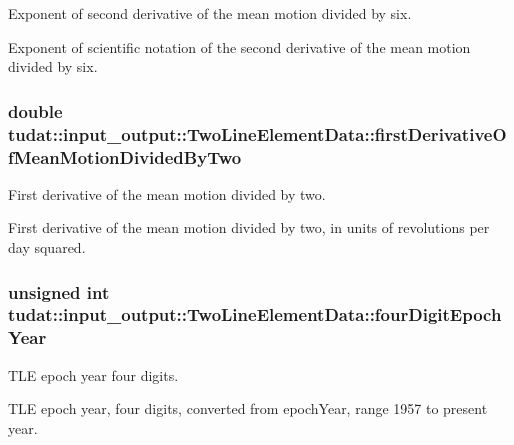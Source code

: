 Exponent of second derivative of the mean motion divided by six. 

Exponent of scientific notation of the second derivative of the mean motion divided by six. 
\subsubsection[{\texorpdfstring{first\+Derivative\+Of\+Mean\+Motion\+Divided\+By\+Two}{firstDerivativeOfMeanMotionDividedByTwo}}]{\setlength{\rightskip}{0pt plus 5cm}double tudat\+::input\+\_\+output\+::\+Two\+Line\+Element\+Data\+::first\+Derivative\+Of\+Mean\+Motion\+Divided\+By\+Two}\hypertarget{structtudat_1_1input__output_1_1TwoLineElementData_a398870b0d7ec141239036ff0bb433c8e}{}\label{structtudat_1_1input__output_1_1TwoLineElementData_a398870b0d7ec141239036ff0bb433c8e}


First derivative of the mean motion divided by two. 

First derivative of the mean motion divided by two, in units of revolutions per day squared. 
\subsubsection[{\texorpdfstring{four\+Digit\+Epoch\+Year}{fourDigitEpochYear}}]{\setlength{\rightskip}{0pt plus 5cm}unsigned int tudat\+::input\+\_\+output\+::\+Two\+Line\+Element\+Data\+::four\+Digit\+Epoch\+Year}\hypertarget{structtudat_1_1input__output_1_1TwoLineElementData_abfd98150e6d9217eec4cd23fcf99dc8a}{}\label{structtudat_1_1input__output_1_1TwoLineElementData_abfd98150e6d9217eec4cd23fcf99dc8a}


T\+LE epoch year four digits. 

T\+LE epoch year, four digits, converted from epoch\+Year, range 1957 to present year. 
